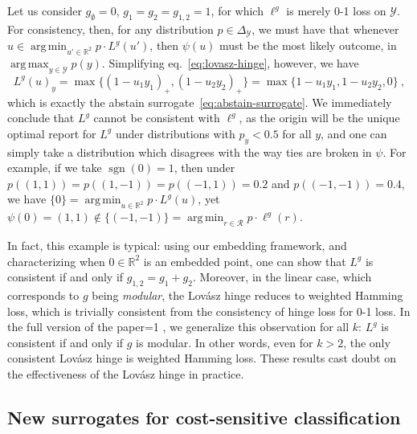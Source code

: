 \documentclass[12pt]{article}
\newcommand{\Comments}{1}
\newcommand{\mytodo}[2]{\ifnum\Comments=1%
  \todo[linecolor=#1!80!black,backgroundcolor=#1,bordercolor=#1!80!black]{#2}\fi}
\newcommand{\raft}[1]{\mytodo{green!20!white}{RF: #1}}
\newcommand{\reals}{\mathbb{R}}
\newcommand{\simplex}{\Delta_\Y}
\newcommand{\R}{\mathcal{R}}
\newcommand{\Y}{\mathcal{Y}}
\DeclareMathOperator*{\argmax}{arg\,max}
\DeclareMathOperator*{\argmin}{arg\,min}
\DeclareMathOperator*{\sgn}{sgn}
\begin{document}
Let us consider $g_\emptyset = 0$, $g_1 = g_2 = g_{1,2} = 1$, for which $\ell^g$ is merely 0-1 loss on $\Y$.
For consistency, then, for any distribution $p\in\simplex$, we must have that whenever $u \in \argmin_{u'\in\reals^2} p\cdot L^g(u')$, then $\psi(u)$ must be the most likely outcome, in $\argmax_{y\in\Y} p(y)$.
Simplifying eq.~\eqref{eq:lovasz-hinge}, however, we have
\begin{equation}
  \label{eq:lovasz-hinge-abstain}
  L^g(u)_y = \max\bigl\{(1-u_1y_1)_+,(1-u_2y_2)_+\bigr\} = \max\bigl\{1-u_1y_1,1-u_2y_2,0\bigr\}~,
\end{equation}
which is exactly the abstain surrogate~\eqref{eq:abstain-surrogate}.
We immediately conclude that $L^g$ cannot be consistent with $\ell^g$, as the origin will be the unique optimal report for $L^g$ under distributions with $p_y < 0.5$ for all $y$, and one can simply take a distribution which disagrees with the way ties are broken in $\psi$.
For example, if we take $\sgn(0) = 1$, then under $p((1,1)) = p((1,-1)) = p((-1,1)) = 0.2$ and $p((-1,-1)) = 0.4$, we have $\{0\} = \argmin_{u\in\reals^2} p\cdot L^g(u)$, yet $\psi(0) = (1,1) \notin \{(-1,-1)\} = \argmin_{r\in\R} p\cdot\ell^g(r)$.

In fact, this example is typical: using our embedding framework, and characterizing when $0\in\reals^2$ is an embedded point, one can show that $L^g$ is consistent if and only if $g_{1,2} = g_1 + g_2$.
Moreover, in the linear case, which corresponds to $g$ being \emph{modular}, the Lov\'asz hinge reduces to weighted Hamming loss, which is trivially consistent from the consistency of hinge loss for 0-1 loss.
In the full version of the paper\raft{add cite later}, we generalize this observation for all $k$: $L^g$ is consistent if and only if $g$ is modular.
In other words, even for $k>2$, the only consistent Lov\'asz hinge is weighted Hamming loss.
These results cast doubt on the effectiveness of the Lov\'asz hinge in practice.


\subsection{New surrogates for cost-sensitive classification}
\end{document}

